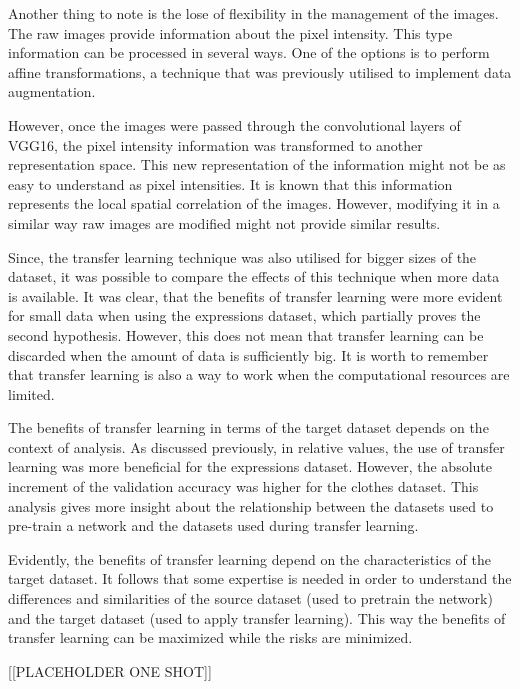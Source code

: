 \documentclass{article}
\begin{document}
Another thing to note is the lose of flexibility in the management of the images. The raw images provide information about the pixel intensity. This type information can be processed in several ways. One of the options is to perform affine transformations, a technique that was previously utilised to implement data augmentation.

However, once the images were passed through the convolutional layers of VGG16, the pixel intensity information was transformed to another representation space. This new representation of the information might not be as easy to understand as pixel intensities. It is known that this information represents the local spatial correlation of the images. However, modifying it in a similar way raw images are modified might not provide similar results.

Since, the transfer learning technique was also utilised for bigger sizes of the dataset, it was possible to compare the effects of this technique when more data is available. It was clear, that the benefits of transfer learning were more evident for small data when using the expressions dataset, which partially proves the second hypothesis. However, this does not mean that transfer learning can be discarded when the amount of data is sufficiently big. It is worth to remember that transfer learning is also a way to work when the computational resources are limited.

The benefits of transfer learning in terms of the target dataset depends on the context of analysis. As discussed previously, in relative values, the use of transfer learning was more beneficial for the expressions dataset. However, the absolute increment of the validation accuracy was higher for the clothes dataset. This analysis gives more insight about the relationship between the datasets used to pre-train a network and the datasets used during transfer learning. 

Evidently, the benefits of transfer learning depend on the characteristics of the target dataset. It follows that some expertise is needed in order to understand the differences and similarities of the source dataset (used to pretrain the network) and the target dataset (used to apply transfer learning). This way the benefits of transfer learning can be maximized while the risks are minimized.

[[PLACEHOLDER ONE SHOT]]




\end{document}
